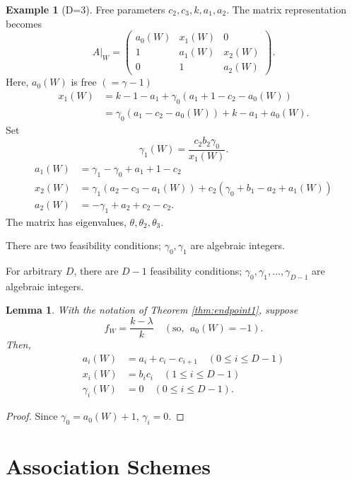 \documentclass[
]{book}
\newtheorem{lemma}{Lemma}[chapter]
\theoremstyle{definition}
\theoremstyle{definition}
\newtheorem{example}{Example}[chapter]
\theoremstyle{definition}
\theoremstyle{definition}
\theoremstyle{remark}
\begin{document}
\begin{example}[D=3]
Free parameters \(c_2, c_3, k, a_1, a_2\). The matrix representation becomes
\[
A|_{W} = \begin{pmatrix} a_0(W) & x_1(W) & 0 \\ 1 & a_1(W) & x_2(W)\\ 0 & 1 & a_2(W) \end{pmatrix}.\]
Here, \(a_0(W)\) is free \((=\gamma - 1)\)
\begin{align}
x_1(W) & = k - 1 - a_1 + \gamma_0(a_1 + 1 - c_2 - a_0(W))\\
& = \gamma_0(a_1 - c_2 - a_0(W)) + k - a_1 + a_0(W).
\end{align}
Set
\[\gamma_1(W) = \frac{c_2b_2\gamma_0}{x_1(W)}.\]
\begin{align}
a_1(W) & = \gamma_1 - \gamma_0 + a_1 + 1 - c_2\\
x_2(W) & = \gamma_1(a_2 - c_3 - a_1(W)) + c_2(\gamma_0 + b_1 - a_2 + a_1(W))\\
a_2(W) & = -\gamma_1 + a_2 + c_2 - c_2.
\end{align}
The matrix has eigenvalues, \(\theta, \theta_2, \theta_3\).

There are two feasibility conditions; \(\gamma_0, \gamma_1\) are algebraic integers.

For arbitrary \(D\), there are \(D-1\) feasibility conditions;
\(\gamma_0, \gamma_1, \ldots, \gamma_{D-1}\) are algebraic integers.
\end{example}

\begin{lemma}
\protect\hypertarget{lem:aixigi}{}\label{lem:aixigi}With the notation of Theorem \ref{thm:endpoint1}, suppose
\[f_W = \frac{k-\lambda}{k} \quad (\text{so, }\; a_0(W) = -1).\]
Then,
\begin{align}
a_i(W) & = a_i + c_i - c_{i+1} \quad (0\leq i\leq D-1)\\
x_i(W) & = b_ic_i \quad (1\leq i\leq D-1)\\
\gamma_i(W) & = 0 \quad (0\leq i\leq D-1).
\end{align}
\end{lemma}

\begin{proof}
Since \(\gamma_0 = a_0(W) + 1\), \(\gamma_i = 0\).
\end{proof}

\hypertarget{lec17}{%
\chapter{Association Schemes}\label{lec17}}
\end{document}
